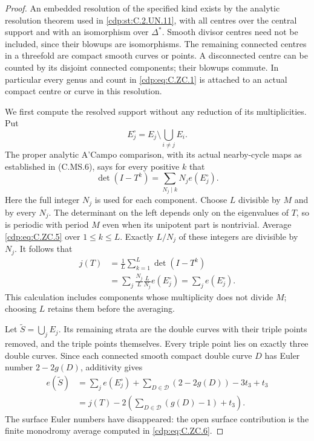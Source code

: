 \begin{proof}
An embedded resolution of the specified kind
exists by the analytic resolution theorem used
in \ref{cdp:st:C.2.UN.11}, with all centres over the central
support and with an isomorphism over
$\Delta^*$. Smooth divisor centres need
not be included, since their blowups are
isomorphisms. The remaining connected centres
in a threefold are compact smooth curves or
points. A disconnected centre can be counted
by its disjoint connected components; their
blowups commute. In particular every genus
and count in \eqref{cdp:eq:C.ZC.1} is attached to an actual
compact centre or curve in this resolution.

We first compute the resolved support without
any reduction of its multiplicities. Put
\[
             E_j^\circ=E_j\setminus\bigcup_{i\ne j}E_i.
\]
The proper analytic A'Campo comparison, with
its actual nearby-cycle maps as established
in (C.MS.6), says for every positive $k$ that
\[
         \det(I-T^k)=\sum_{N_j\mid k}N_j e(E_j^\circ).
                                                               \tag{C.ZC.5}\label{cdp:eq:C.ZC.5}
\]
Here the full integer $N_j$ is used for each
component. Choose $L$ divisible by $M$ and
by every $N_j$. The determinant on the left
depends only on the eigenvalues of $T$,
so is periodic with period $M$ even when
its unipotent part is nontrivial. Average
\eqref{cdp:eq:C.ZC.5} over $1\le k\le L$. Exactly $L/N_j$
of these integers are divisible by $N_j$.
It follows that
\[
 \begin{split}
 j(T)
 &=\frac1L\sum_{k=1}^{L}\det(I-T^k)\\
 &=\sum_j\frac{N_j}{L}\frac{L}{N_j}e(E_j^\circ)
   =\sum_j e(E_j^\circ).
 \end{split}                                                   \tag{C.ZC.6}\label{cdp:eq:C.ZC.6}
\]
This calculation includes components whose
multiplicity does not divide $M$; choosing
$L$ retains them before the averaging.

Let $\widetilde S=\bigcup_jE_j$. Its
remaining strata are the double curves
with their triple points removed, and
the triple points themselves. Every
triple point lies on exactly three
double curves. Since each connected
smooth compact double curve $D$ has
Euler number $2-2g(D)$, additivity gives
\[
 \begin{split}
 e(\widetilde S)
 &=\sum_j e(E_j^\circ)
       +\sum_{D\in\mathcal D}(2-2g(D))-3t_3+t_3\\
 &=j(T)-2\left(
           \sum_{D\in\mathcal D}(g(D)-1)+t_3\right).
 \end{split}                                                   \tag{C.ZC.7}\label{cdp:eq:C.ZC.7}
\]
The surface Euler numbers have disappeared:
the open surface contribution is the finite
monodromy average computed in \eqref{cdp:eq:C.ZC.6}.


\end{proof}
